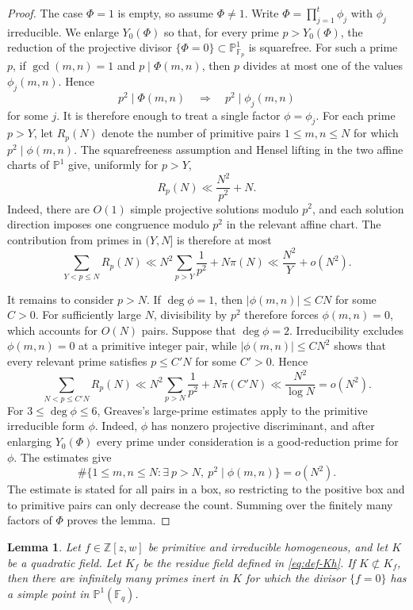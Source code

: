 \documentclass[12pt,reqno]{amsart}
\numberwithin{equation}{section}
\newtheorem{lemma}[theorem]{Lemma}
\theoremstyle{definition}
\renewcommand{\le}{\leqslant}
\newcommand{\PP}{\mathbb{P}}
\newcommand{\FF}{\mathbb{F}}
\newcommand{\ZZ}{\mathbb{Z}}
\begin{document}
\begin{proof}
The case $\Phi=1$ is empty, so assume $\Phi\ne1$.
Write $\Phi=\prod_{j=1}^t \phi_j$ with $\phi_j$ irreducible.
We enlarge $Y_0(\Phi)$ so that, for every prime $p>Y_0(\Phi)$, the reduction of the projective divisor $\{\Phi=0\}\subset\PP^1_{\FF_p}$ is squarefree.
For such a prime $p$, if $\gcd(m,n)=1$ and $p\mid\Phi(m,n)$, then $p$ divides at most one of the values $\phi_j(m,n)$.
Hence
\[
p^2\mid \Phi(m,n)\quad\Longrightarrow\quad
p^2\mid \phi_j(m,n)
\]
for some $j$.
It is therefore enough to treat a single factor $\phi=\phi_j$.
For each prime $p>Y$, let $R_p(N)$ denote the number of primitive pairs $1\le m,n\le N$ for which $p^2\mid\phi(m,n)$.
The squarefreeness assumption and Hensel lifting in the two affine charts of $\PP^1$ give, uniformly for $p>Y$,
\[
R_p(N)\ll \frac{N^2}{p^2}+N.
\]
Indeed, there are $O(1)$ simple projective solutions modulo $p^2$, and each solution direction imposes one congruence modulo $p^2$ in the relevant affine chart.
The contribution from primes in $(Y,N]$ is therefore at most
\[
\sum_{Y<p\le N}R_p(N)
\ll N^2\sum_{p>Y}\frac1{p^2}+N\pi(N)
\ll \frac{N^2}{Y}+o(N^2).
\]

It remains to consider $p>N$.
If $\deg\phi=1$, then $|\phi(m,n)|\le CN$ for some $C>0$.
For sufficiently large $N$, divisibility by $p^2$ therefore forces $\phi(m,n)=0$, which accounts for $O(N)$ pairs.
Suppose that $\deg\phi=2$.
Irreducibility excludes $\phi(m,n)=0$ at a primitive integer pair, while $|\phi(m,n)|\le CN^2$ shows that every relevant prime satisfies $p\le C'N$ for some $C'>0$.
Hence
\[
\sum_{N<p\le C'N}R_p(N)
\ll N^2\sum_{p>N}\frac1{p^2}+N\pi(C'N)
\ll \frac{N^2}{\log N}
=o(N^2).
\]
For $3\le\deg\phi\le6$, Greaves's large-prime estimates
\cite[Lemma~2 and the final large-prime estimate in the proof of the main theorem]{Gre92}
apply to the primitive irreducible form $\phi$.
Indeed, $\phi$ has nonzero projective discriminant, and after enlarging $Y_0(\Phi)$ every prime under consideration is a good-reduction prime for $\phi$.
The estimates give
\[
\#\{1\le m,n\le N:\exists~p>N,\ p^2\mid\phi(m,n)\}=o(N^2).
\]
The estimate is stated for all pairs in a box, so restricting to the positive box and to primitive pairs can only decrease the count.
Summing over the finitely many factors of $\Phi$ proves the lemma.
\end{proof}

\begin{lemma}\label{lem:chebotarev-projective}
Let $f\in\ZZ[z,w]$ be primitive and irreducible homogeneous, and let $K$ be a quadratic field.
Let $K_f$ be the residue field defined in \eqref{eq:def-Kh}.
If $K\not\subset K_f$, then there are infinitely many primes inert in $K$ for which the divisor $\{f=0\}$ has a simple point in $\PP^1(\FF_q)$.
\end{lemma}
\end{document}
